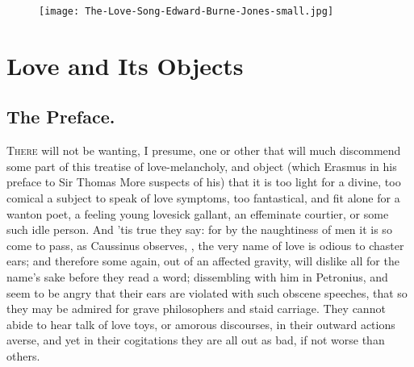 \cleartoleftpage{}
\begin{figure}[p!]
  \begingroup
  \centering
  \texttt{[image: The-Love-Song-Edward-Burne-Jones-small.jpg]}
  \label{fig:thelovesong}
\end{figure}

\clearpage{}
\thispagestyle{titleontop}
\chapter{Love and Its Objects}
{
\section{The Preface.}

\lettrine{T}{here} will not be wanting, I presume, one or other that will much
discommend some part of this treatise of love-melancholy, and object
(which Erasmus in his preface to Sir Thomas More suspects of his)
that it is too light for a divine, too comical a subject to speak of
love symptoms, too fantastical, and fit alone for a wanton poet, a
feeling young lovesick gallant, an effeminate courtier, or some such
idle person. And 'tis true they say: for by the naughtiness of men it
is so come to pass, as  Caussinus observes, , the very name of love is odious to
chaster ears; and therefore some again, out of an affected gravity,
will dislike all for the name's sake before they read a word;
dissembling with him in Petronius, and seem to be angry that
their ears are violated with such obscene speeches, that so they may be
admired for grave philosophers and staid carriage. They cannot abide to
hear talk of love toys, or amorous discourses,  in
their outward actions averse, and yet in their cogitations they are all
out as bad, if not worse than others.


}
